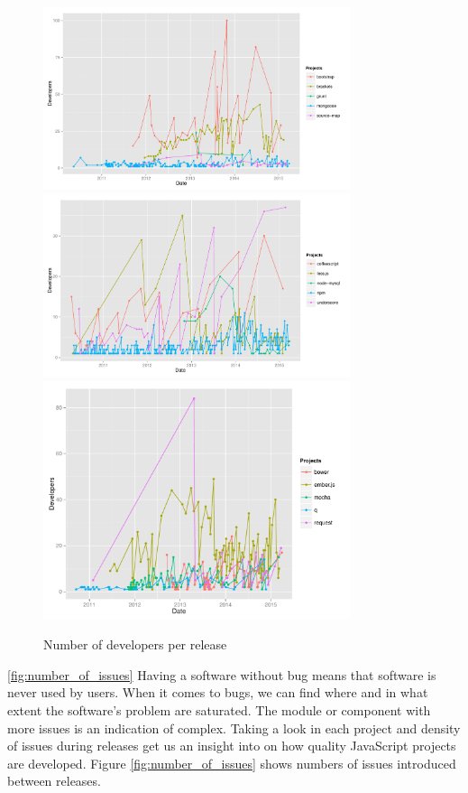 \begin{figure}[thb!]
	\caption{Number of developers per release}
	\label{fig:number_of_developers}
	\includegraphics[width=90mm,scale=0.5]{figures/number_of_developers}
	\includegraphics[width=90mm,scale=0.5]{figures/number_of_developers_2}
	\includegraphics[width=90mm,scale=0.5]{figures/number_of_developers_3}
\end{figure}


\ref{fig:number_of_issues}
Having a software without bug means that software is never used by users. When it comes to bugs, we can find where and in what extent the software's problem are saturated. The module or component with more issues is an indication of complex. Taking a look in each project and density of issues during releases get us an insight into on how quality JavaScript projects are developed. Figure \ref{fig:number_of_issues} shows numbers of issues introduced between releases.

